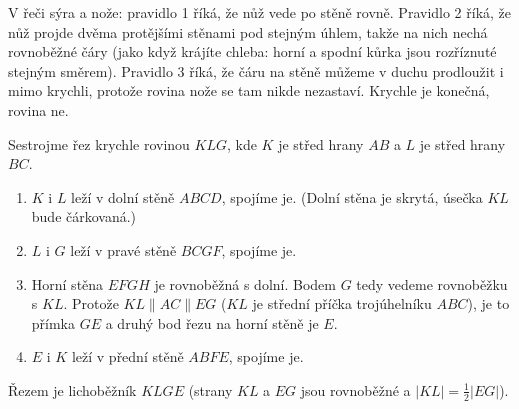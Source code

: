 V řeči sýra a nože: pravidlo 1 říká, že nůž vede po stěně rovně. Pravidlo 2 říká, že nůž projde dvěma protějšími stěnami pod stejným úhlem, takže na nich nechá rovnoběžné čáry (jako když krájíte chleba: horní a spodní kůrka jsou rozříznuté stejným směrem). Pravidlo 3 říká, že čáru na stěně můžeme v duchu prodloužit i mimo krychli, protože rovina nože se tam nikde nezastaví. Krychle je konečná, rovina ne.

\begin{example}
  Sestrojme řez krychle rovinou $KLG$, kde $K$ je střed hrany $AB$ a $L$ je střed hrany $BC$.
  \begin{enumerate}
    \item $K$ i $L$ leží v dolní stěně $ABCD$, spojíme je. (Dolní stěna je skrytá, úsečka $KL$ bude čárkovaná.)
    \item $L$ i $G$ leží v pravé stěně $BCGF$, spojíme je.
    \item Horní stěna $EFGH$ je rovnoběžná s dolní. Bodem $G$ tedy vedeme rovnoběžku s $KL$. Protože $KL\parallel AC\parallel EG$ ($KL$ je střední příčka trojúhelníku $ABC$), je to přímka $GE$ a druhý bod řezu na horní stěně je $E$.
    \item $E$ i $K$ leží v přední stěně $ABFE$, spojíme je.
  \end{enumerate}
  Řezem je lichoběžník $KLGE$ (strany $KL$ a $EG$ jsou rovnoběžné a $|KL| = \frac{1}{2}|EG|$).
  \begin{center}
  \end{center}
\end{example}

